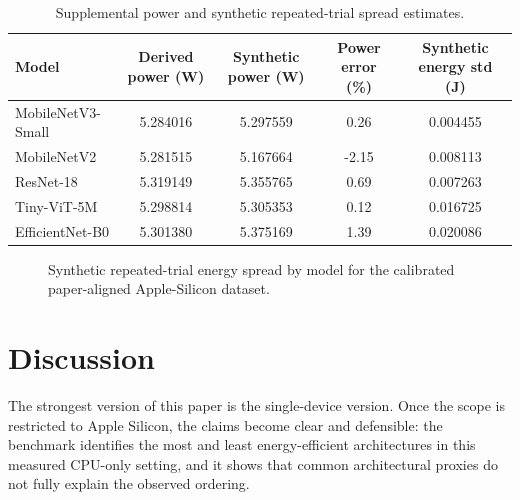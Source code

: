 \documentclass[11pt]{article}
\begin{document}
\begin{table}[ht]
\centering
\caption{Supplemental power and synthetic repeated-trial spread estimates.}
\label{tab:supplemental}
\begin{tabular}{l
S[table-format=1.6]
S[table-format=1.6]
S[table-format=2.2]
S[table-format=1.6]}
\toprule
Model &
{Derived power (W)} &
{Synthetic power (W)} &
{Power error (\%)} &
{Synthetic energy std (J)} \\
\midrule
MobileNetV3-Small & 5.284016 & 5.297559 & 0.26 & 0.004455 \\
MobileNetV2 & 5.281515 & 5.167664 & -2.15 & 0.008113 \\
ResNet-18 & 5.319149 & 5.355765 & 0.69 & 0.007263 \\
Tiny-ViT-5M & 5.298814 & 5.305353 & 0.12 & 0.016725 \\
EfficientNet-B0 & 5.301380 & 5.375169 & 1.39 & 0.020086 \\
\bottomrule
\end{tabular}
\end{table}

\begin{figure}[ht]
\centering
{}
\caption{Synthetic repeated-trial energy spread by model for the calibrated paper-aligned Apple-Silicon dataset.}
\label{fig:energy-std}
\end{figure}

\section{Discussion}
The strongest version of this paper is the single-device version. Once the scope
is restricted to Apple Silicon, the claims become clear and defensible: the
benchmark identifies the most and least energy-efficient architectures in this
measured CPU-only setting, and it shows that common architectural proxies do
not fully explain the observed ordering.
\end{document}
